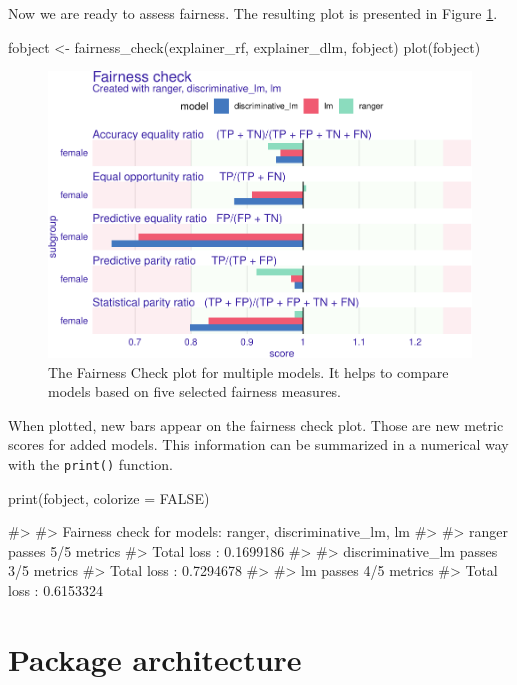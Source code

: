 Now we are ready to assess fairness. The resulting plot is presented in
Figure \ref{fig:fairness-plot-3}.

\begin{Schunk}
\begin{Sinput}
fobject <- fairness_check(explainer_rf, explainer_dlm, fobject)
plot(fobject)
\end{Sinput}
\begin{figure}

{\centering \includegraphics[width=0.75\linewidth]{RJ-2022-019_files/figure-latex/fairness-plot-3-1} 

}

\caption[The Fairness Check plot for multiple models]{The Fairness Check plot for multiple models. It helps to compare models based on five selected fairness measures. }\label{fig:fairness-plot-3}
\end{figure}
\end{Schunk}

When plotted, new bars appear on the fairness check plot. Those are new
metric scores for added models. This information can be summarized in a
numerical way with the \texttt{print()} function.

\begin{Schunk}
\begin{Sinput}
print(fobject, colorize = FALSE)
\end{Sinput}
\begin{Soutput}
#> 
#> Fairness check for models: ranger, discriminative_lm, lm 
#> 
#> ranger passes 5/5 metrics
#> Total loss :  0.1699186 
#> 
#> discriminative_lm passes 3/5 metrics
#> Total loss :  0.7294678 
#> 
#> lm passes 4/5 metrics
#> Total loss :  0.6153324
\end{Soutput}
\end{Schunk}

\hypertarget{package-architecture}{%
\section{Package architecture}\label{package-architecture}}

